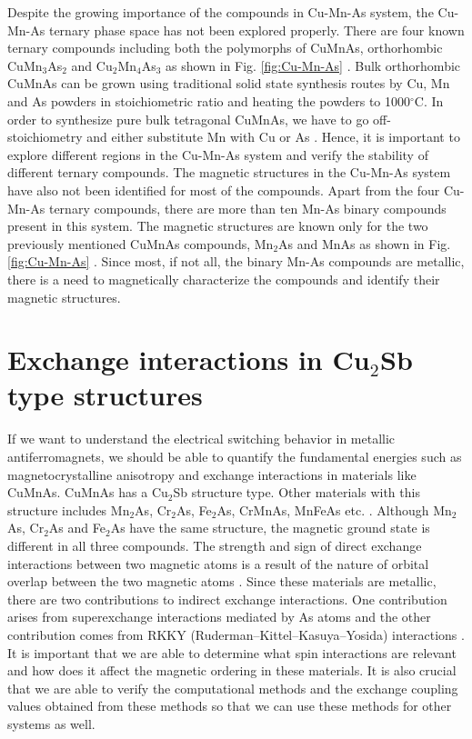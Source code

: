\documentclass[11pt,edeposit,draftthesis]{uiucthesis2020}
\begin{document}
\begin{mainmatter}
Despite the growing importance of the compounds in Cu-Mn-As system, the Cu-Mn-As ternary phase space has not been explored properly. There are four known ternary compounds including both the polymorphs of CuMnAs, orthorhombic CuMn$_3$As$_2$ and Cu$_2$Mn$_4$As$_3$ as shown in Fig. \ref{fig:Cu-Mn-As} \cite{Nateprov2011,MacA2012,Wadley2013,Uhlirova2015}. Bulk orthorhombic CuMnAs can be grown using traditional solid state synthesis routes by Cu, Mn and As powders in stoichiometric ratio and heating the powders to 1000$^\circ$C. In order to synthesize pure bulk tetragonal CuMnAs, we have to go off-stoichiometry and either substitute Mn with Cu or As \cite{Uhlirova2015}. Hence, it is important to explore different regions in the Cu-Mn-As system and verify the stability of different ternary compounds. The magnetic structures in the Cu-Mn-As system have also not been identified for most of the compounds. Apart from the four Cu-Mn-As ternary compounds, there are more than ten Mn-As binary compounds present in this system. The magnetic structures are known only for the two previously mentioned CuMnAs compounds, Mn$_2$As and MnAs as shown in Fig. \ref{fig:Cu-Mn-As} \cite{MacA2012,Wadley2013,Hills2015,Wadley2015,Austin1962,Bacon1955}. Since most, if not all, the binary Mn-As compounds are metallic, there is a need to magnetically characterize the compounds and identify their magnetic structures.

\section{Exchange interactions in Cu$_2$Sb type structures}

If we want to understand the electrical switching behavior in metallic antiferromagnets, we should be able to quantify the fundamental energies such as magnetocrystalline anisotropy and exchange interactions in materials like CuMnAs. CuMnAs has a Cu$_2$Sb structure type. Other materials with this structure includes Mn$_2$As, Cr$_2$As, Fe$_2$As, CrMnAs, MnFeAs etc. \cite{Lutz-Kappelman2018,Zhang2013,Zhang2015}. Although Mn$_2$As, Cr$_2$As and Fe$_2$As have the same structure, the magnetic ground state is different in all three compounds. The strength and sign of direct exchange interactions between two magnetic atoms is a result of the nature of orbital overlap between the two magnetic atoms \cite{Zhang2013}. Since these materials are metallic, there are two contributions to indirect exchange interactions. One contribution arises from superexchange interactions mediated by As atoms and the other contribution comes from RKKY (Ruderman–Kittel–Kasuya–Yosida) interactions \cite{Zhang2015}. It is important that we are able to determine what spin interactions are relevant and how does it affect the magnetic ordering in these materials. It is also crucial that we are able to verify the computational methods and the exchange coupling values obtained from these methods so that we can use these methods for other systems as well.


\end{mainmatter}
\end{document}
